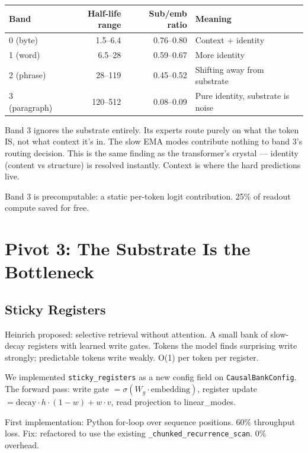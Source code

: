 \documentclass[11pt,a4paper]{report}
\begin{document}
\begin{center}
\begin{tabular}{lrrl}
\toprule
Band & Half-life range & Sub/emb ratio & Meaning \\
\midrule
0 (byte) & 1.5--6.4 & 0.76--0.80 & Context + identity \\
1 (word) & 6.5--28 & 0.59--0.67 & More identity \\
2 (phrase) & 28--119 & 0.45--0.52 & Shifting away from substrate \\
3 (paragraph) & 120--512 & 0.08--0.09 & Pure identity, substrate is noise \\
\bottomrule
\end{tabular}
\end{center}

Band 3 ignores the substrate entirely. Its experts route purely on what the token IS, not what context it's in. The slow EMA modes contribute nothing to band 3's routing decision. This is the same finding as the transformer's crystal --- identity (content vs structure) is resolved instantly. Context is where the hard predictions live.

Band 3 is precomputable: a static per-token logit contribution. 25\% of readout compute saved for free.

\chapter{Pivot 3: The Substrate Is the Bottleneck}

\section{Sticky Registers}

Heinrich proposed: selective retrieval without attention. A small bank of slow-decay registers with learned write gates. Tokens the model finds surprising write strongly; predictable tokens write weakly. O(1) per token per register.

We implemented \texttt{sticky\_registers} as a new config field on \texttt{CausalBankConfig}. The forward pass: write gate $= \sigma(W_g \cdot \text{embedding})$, register update $= \text{decay} \cdot h \cdot (1 - w) + w \cdot v$, read projection to linear\_modes.

First implementation: Python for-loop over sequence positions. 60\% throughput loss. Fix: refactored to use the existing \texttt{\_chunked\_recurrence\_scan}. 0\% overhead.
\end{document}
